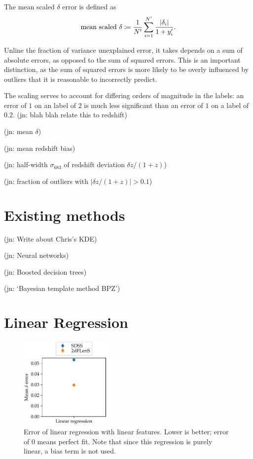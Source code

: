\documentclass[11pt,twoside]{report}
\newcommand\abs[1]{\left|#1\right|}
\newcommand\jn[1]{{\color{red}(jn: #1)}}
\begin{document}
The mean scaled $\delta$ error is defined as\[
  \textrm{mean scaled $\delta$} \coloneqq \frac{1}{N'}\sum_{i=1}^{N'} \frac{\abs{\delta_i}}{1 + y'_i} \text.
\]

Unline the fraction of variance unexplained error, it takes depends on a sum of absolute errors, as opposed to the sum of squared errors. This is an important distinction, as the sum of squared errors is more likely to be overly influenced by outliers that it is reasonable to incorrectly predict.

The scaling serves to account for differing orders of magnitude in the labels: an error of $1$ on an label of $2$ is much less significant than an error of $1$ on a label of $0.2$. \jn{blah blah relate this to redshift}

\jn{mean $\delta$}

\jn{mean redshift bias}

\jn{half-width $\sigma_{683}$ of redshift deviation $\delta z/(1+z)$}

\jn{fraction of outliers with $\abs{\delta z /(1+z)} > 0.1$}

\section{Existing methods}

\jn{Write about Chris's KDE}

\jn{Neural networks}

\jn{Boosted decision trees}

\jn{`Bayesian template method BPZ'}

\section{Linear Regression}

  \begin{figure}
    \centering
    \includegraphics[width=0.4\textwidth]{linreg_plain.pdf}
    \caption{Error of linear regression with linear features. Lower is better; error of $0$ means perfect fit. Note that since this regression is purely linear, a bias term is not used.}
    \label{fig:linreg_plain}
  \end{figure}
\end{document}
